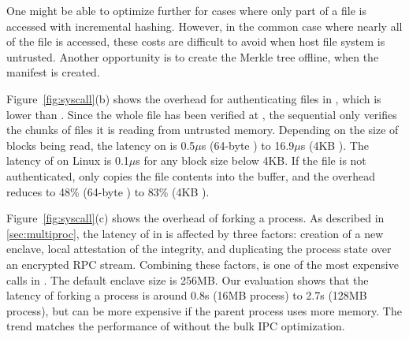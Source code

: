 One might be able to optimize further for cases where only part of a file is accessed
with incremental hashing.  However, in the common case where nearly all of the file is accessed,
these costs are difficult to avoid when host file system is untrusted.
Another opportunity 
is to create the Merkle tree offline, when the manifest is created.



Figure~\ref{fig:syscall}(b)
shows the overhead for authenticating files in , which 
is lower than .
Since the whole file has been verified at , the sequential  only verifies the chunks of files it is reading from untrusted memory.
Depending on the size of blocks being read, the latency on \graphenesgx{} is 0.5$\mu$s (64-byte ) to 16.9$\mu$s (4KB ). The latency of  on Linux is \roughly{}0.1$\mu$s for any block size below 4KB.
If the file is not authenticated,
\graphenesgx{} only copies the file contents into the buffer, and the overhead reduces to 48\% (64-byte ) to 83\% (4KB ).



Figure~\ref{fig:syscall}(c) shows the overhead of forking a process.
As described in \ref{sec:multiproc}, the latency of  in \graphenesgx{} is affected by three factors:
creation of a new enclave, local attestation of the integrity, and duplicating the process state over an encrypted RPC stream.
Combining these factors,  is one of the most expensive calls in \graphenesgx{}.
The default enclave size is 256MB.
Our evaluation shows that the latency of forking a process is around 0.8s (16MB process) to 2.7s (128MB process), but can be more expensive if the parent process uses more memory.
The trend matches the performance of \graphene{} without the bulk IPC optimization.

